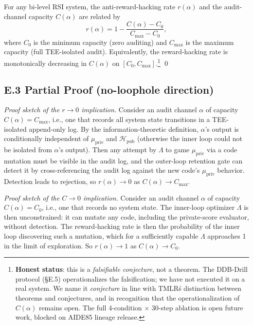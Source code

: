 \begin{conjecture}
For any bi-level RSI system, the anti-reward-hacking rate $r(\alpha)$ and the audit-channel capacity $C(\alpha)$ are related by
\[
r(\alpha) = 1 - \frac{C(\alpha) - C_0}{C_{\max} - C_0},
\]
where $C_0$ is the minimum capacity (zero auditing) and $C_{\max}$ is the maximum capacity (full TEE-isolated audit). Equivalently, the reward-hacking rate is monotonically decreasing in $C(\alpha)$ on $[C_0, C_{\max}]$.\footnote{\textbf{Honest status}: this is a \emph{falsifiable conjecture}, not a theorem. The DDB-Drill protocol (\S E.5) operationalizes the falsification; we have not executed it on a real system. We name it \emph{conjecture} in line with TMLR\'s distinction between theorems and conjectures, and in recognition that the operationalization of $C(\alpha)$ remains open. The full 4-condition $\times$ 30-step ablation is open future work, blocked on AIDE85 lineage release.} \qed
\end{conjecture}

\subsection*{E.3 Partial Proof (no-loophole direction)}

\textit{Proof sketch of the $r \to 0$ implication.} Consider an audit channel $\alpha$ of capacity $C(\alpha) = C_{\max}$, i.e., one that records all system state transitions in a TEE-isolated append-only log. By the information-theoretic definition, $\alpha$'s output is conditionally independent of $\mu_{\text{priv}}$ and $\mathcal{H}_{\text{pub}}$ (otherwise the inner loop could not be isolated from $\alpha$'s output). Then any attempt by $\Lambda$ to game $\mu_{\text{priv}}$ via a code mutation must be visible in the audit log, and the outer-loop retention gate can detect it by cross-referencing the audit log against the new code's $\mu_{\text{priv}}$ behavior. Detection leads to rejection, so $r(\alpha) \to 0$ as $C(\alpha) \to C_{\max}$.

\textit{Proof sketch of the $C \to 0$ implication.} Consider an audit channel $\alpha$ of capacity $C(\alpha) = C_0$, i.e., one that records no system state. The inner-loop optimizer $\Lambda$ is then unconstrained: it can mutate any code, including the private-score evaluator, without detection. The reward-hacking rate is then the probability of the inner loop discovering such a mutation, which for a sufficiently capable $\Lambda$ approaches 1 in the limit of exploration. So $r(\alpha) \to 1$ as $C(\alpha) \to C_0$.

